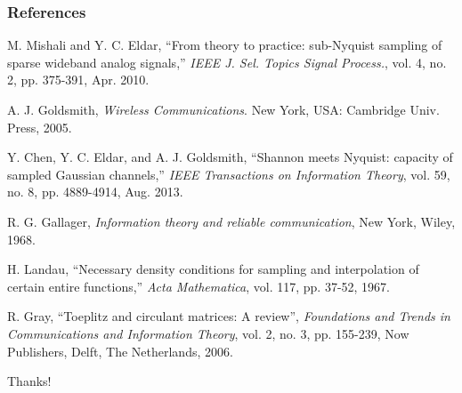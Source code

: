 \documentclass{beamer}
\begin{document}


\begin{frame}
\frametitle{References}
\scriptsize{
\begin{thebibliography}{1} %

    M. Mishali and Y. C. Eldar, ``From theory to practice: sub-Nyquist sampling of sparse wideband analog signals,'' \emph{IEEE J. Sel. Topics Signal Process.}, vol. 4, no. 2, pp. 375-391, Apr. 2010.

    A. J. Goldsmith, \emph{Wireless Communications}. New York, USA: Cambridge Univ. Press, 2005.

    Y. Chen, Y. C. Eldar, and A. J. Goldsmith, ``Shannon meets Nyquist: capacity of sampled Gaussian channels,'' \emph{IEEE Transactions on Information Theory}, vol. 59, no. 8, pp. 4889-4914, Aug. 2013.

  R. G. Gallager, \emph{Information theory and reliable communication}, New York, Wiley, 1968.
  
  H. Landau, ``Necessary density conditions for sampling and interpolation of certain entire functions,'' \emph{Acta Mathematica}, vol. 117, pp. 37-52, 1967.

  R. Gray, ``Toeplitz and circulant matrices: A review'', \emph{Foundations and Trends in Communications and Information Theory}, vol. 2, no. 3, pp. 155-239, Now Publishers, Delft, The Netherlands, 2006.

\end{thebibliography}
}
\end{frame}


\begin{frame}
\Huge{\centerline{Thanks!}}
\end{frame}

\end{document}
